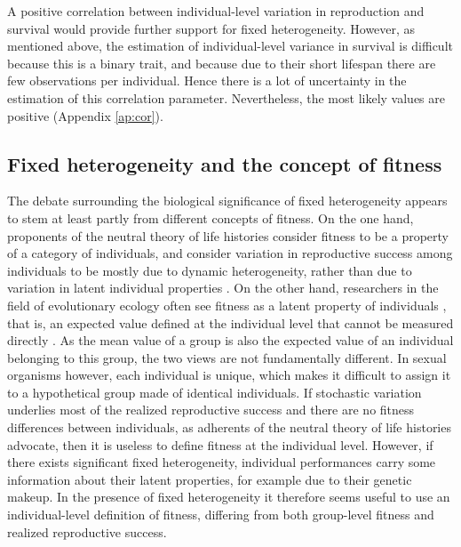 A positive correlation between individual-level variation in reproduction and survival would provide further support for fixed heterogeneity. However, as mentioned above, the estimation of individual-level variance in survival is difficult because this is a binary trait, and because due to their short lifespan there are few observations per individual. Hence there is a lot of uncertainty in the estimation of this correlation parameter. Nevertheless, the most likely values are positive (Appendix \ref{ap:cor}).

\subsection{Fixed heterogeneity and the concept of fitness}
The debate surrounding the biological significance of fixed heterogeneity appears to stem at least partly from different concepts of fitness. On the one hand, proponents of the neutral theory of life histories consider fitness to be a property of a category of individuals, and consider variation in reproductive success among individuals to be mostly due to dynamic heterogeneity, rather than due to variation in latent individual properties \parencite{Steiner2012}. On the other hand, researchers in the field of evolutionary ecology often see fitness as a latent property of individuals \parencite{Cam2000}, that is, an expected value defined at the individual level that cannot be measured directly \parencite{Brandon1984,Price1996,Krimbas2004}. 
As the mean value of a group is also the expected value of an individual belonging to this group, the two views are not fundamentally different. In sexual organisms however, each individual is unique, which makes it difficult to assign it to a hypothetical group made of identical individuals. If stochastic variation underlies most of the realized reproductive success and there are no fitness differences between individuals, as adherents of the neutral theory of life histories advocate, then it is useless to define fitness at the individual level. However, if there exists significant fixed heterogeneity, individual performances carry some information about their latent properties, for example due to their genetic makeup. In the presence of fixed heterogeneity it therefore seems useful to use an individual-level definition of fitness, differing from both group-level fitness and realized reproductive success.

